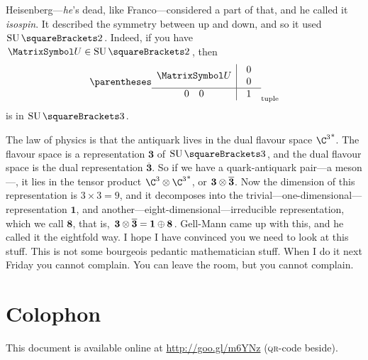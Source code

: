 \documentclass[10pt, a4paper, twoside]{lecturenotes}
\begin{document}
\begin{lecture}[date=2013-04-30, official=true]
Heisenberg---\emph{he}'s dead, like Franco---considered a part of that, and he called it \emph{isospin}. It described the symmetry between up and down, and so it used $\SpecialUnitaryGroup\of 2$. Indeed, if you have $\matU\in\SpecialUnitaryGroup\of 2$, then\[
\tuple{\begin{array}{c|c}
\matU & \begin{array}{c}
0\\0
\end{array} \\
\hline
 \begin{array}{cc}0&0\end{array} & 1
\end{array}}
\] is in $\SpecialUnitaryGroup\of 3$.

\newcommand{\three}{\mathbf 3}
\newcommand{\threebar}{\overline{\mathbf 3}}
\newcommand{\eight}{\mathbf 8}
\newcommand{\one}{\mathbf 1}

The law of physics is that the antiquark lives in the dual flavour space $\Dual{{\C^3}}$. The flavour space is a representation $\three$ of $\SpecialUnitaryGroup\of 3$, and the dual flavour space is the dual representation $\threebar$. So if we have a quark-antiquark pair---a meson---, it lies in the tensor product $\C^3\Tensor\Dual{{\C^3}}$, or $\three\Tensor\threebar$. Now the dimension of this representation is $3\times3=9$, and it decomposes into the trivial---one-dimensional---representation $\one$, and another---eight-dimensional---irreducible representation, which we call $\eight$, that is, $\three\Tensor\threebar=\one\DirectSum\eight$. Gell-Mann came up with this, and he called it the eightfold way. I hope I have convinced you we need to look at this stuff. This is not some bourgeois pedantic mathematician stuff. When I do it next Friday you cannot complain. You can leave the room, but you cannot complain.
\end{lecture}
\endgroup%

\appendix
\newpage
\section*{Colophon}
This document is available online at \url{http://goo.gl/m6YNz} (\textsc{qr}-code beside).
\end{document}
